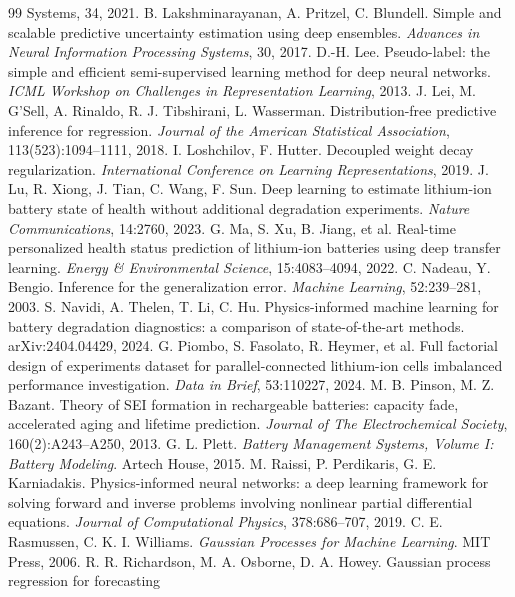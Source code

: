 \documentclass[12pt,a4paper,oneside]{report}
\theoremstyle{plain}
\theoremstyle{definition}
\begin{document}
\begin{thebibliography}{99}
{  Systems}, 34, 2021.
 B. Lakshminarayanan, A. Pritzel, C. Blundell. Simple and scalable predictive
  uncertainty estimation using deep ensembles. \emph{Advances in Neural Information Processing Systems}, 30, 2017.
 D.-H. Lee. Pseudo-label: the simple and efficient semi-supervised learning method for deep neural
  networks. \emph{ICML Workshop on Challenges in Representation Learning}, 2013.
 J. Lei, M. G'Sell, A. Rinaldo, R. J. Tibshirani, L. Wasserman. Distribution-free predictive
  inference for regression. \emph{Journal of the American Statistical Association}, 113(523):1094--1111, 2018.
 I. Loshchilov, F. Hutter. Decoupled weight decay regularization. \emph{International
  Conference on Learning Representations}, 2019.
 J. Lu, R. Xiong, J. Tian, C. Wang, F. Sun. Deep learning to estimate lithium-ion battery state of
  health without additional degradation experiments. \emph{Nature Communications}, 14:2760, 2023.
 G. Ma, S. Xu, B. Jiang, et al. Real-time personalized health status prediction of lithium-ion
  batteries using deep transfer learning. \emph{Energy \& Environmental Science}, 15:4083--4094, 2022.
 C. Nadeau, Y. Bengio. Inference for the generalization error. \emph{Machine Learning},
  52:239--281, 2003.
 S. Navidi, A. Thelen, T. Li, C. Hu. Physics-informed machine learning for battery degradation
  diagnostics: a comparison of state-of-the-art methods. arXiv:2404.04429, 2024.
 G. Piombo, S. Fasolato, R. Heymer, et al. Full factorial design of experiments dataset for
  parallel-connected lithium-ion cells imbalanced performance investigation. \emph{Data in Brief}, 53:110227, 2024.
 M. B. Pinson, M. Z. Bazant. Theory of SEI formation in rechargeable batteries: capacity fade,
  accelerated aging and lifetime prediction. \emph{Journal of The Electrochemical Society}, 160(2):A243--A250, 2013.
 G. L. Plett. \emph{Battery Management Systems, Volume I: Battery Modeling}. Artech House, 2015.
 M. Raissi, P. Perdikaris, G. E. Karniadakis. Physics-informed neural networks: a deep learning
  framework for solving forward and inverse problems involving nonlinear partial differential equations.
  \emph{Journal of Computational Physics}, 378:686--707, 2019.
 C. E. Rasmussen, C. K. I. Williams. \emph{Gaussian Processes for Machine Learning}.
  MIT Press, 2006.
 R. R. Richardson, M. A. Osborne, D. A. Howey. Gaussian process regression for forecasting

\end{thebibliography}
\end{document}
